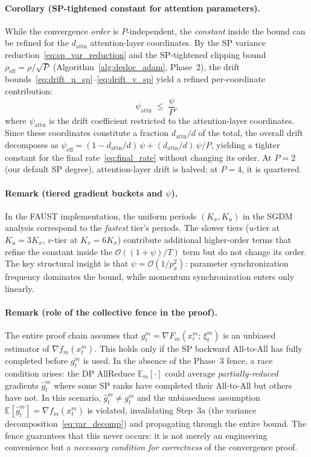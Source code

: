 \documentclass{article}
\begin{document}
\paragraph{Corollary (SP-tightened constant for attention parameters).}
While the convergence \emph{order} is $P$-independent, the
\emph{constant} inside the bound can be refined for the $d_{\text{attn}}$
attention-layer coordinates.
By the SP variance reduction~\eqref{eq:sp_var_reduction} and the
SP-tightened clipping bound $\rho_{\text{eff}} = \rho/\sqrt{P}$
(Algorithm~\ref{alg:desloc_adam}, Phase~2), the drift
bounds~\eqref{eq:drift_u_sp}--\eqref{eq:drift_v_sp} yield a
refined per-coordinate contribution:
\begin{equation}
\psi_{\text{attn}}
\;\leq\; \frac{\psi}{P},
\label{eq:psi_attn_sp}
\end{equation}
where $\psi_{\text{attn}}$ is the drift coefficient restricted to the
attention-layer coordinates. Since these coordinates constitute a fraction
$d_{\text{attn}}/d$ of the total, the overall drift decomposes as
$\psi_{\text{eff}} = (1 - d_{\text{attn}}/d)\,\psi + (d_{\text{attn}}/d)\,\psi/P$,
yielding a tighter constant for the final rate~\eqref{eq:final_rate}
without changing its order.
At $P = 2$ (our default SP degree), attention-layer drift is halved;
at $P = 4$, it is quartered.

\paragraph{Remark (tiered gradient buckets and $\psi$).}
In the FAUST implementation, the uniform periods $(K_x, K_u)$ in the
SGDM analysis correspond to the \emph{fastest} tier's periods. The slower
tiers ($u$-tier at $K_u = 3K_x$, $v$-tier at $K_v = 6K_x$) contribute
additional higher-order terms that refine the constant inside the
$\mathcal{O}((1+\psi)/T)$ term but do not change its order. The key
structural insight is that $\psi = \mathcal{O}(1/p_x^2)$: parameter
synchronization frequency dominates the bound, while momentum
synchronization enters only linearly.

\paragraph{Remark (role of the collective fence in the proof).}
The entire proof chain assumes that $g_t^m = \nabla F_m(x_t^m;\, \xi_t^m)$
is an unbiased estimator of $\nabla f_m(x_t^m)$. This holds only if the
SP backward All-to-All has fully completed before $g_t^m$ is used.
In the absence of the Phase~3 fence, a race condition arises:
the DP AllReduce $\mathbb{E}_m[\cdot]$ could average
\emph{partially-reduced} gradients $\hat{g}_t^m$ where some SP ranks have
completed their All-to-All but others have not.
In this scenario, $\hat{g}_t^m \neq g_t^m$ and the unbiasedness
assumption $\mathbb{E}[\hat{g}_t^m] = \nabla f_m(x_t^m)$ is violated,
invalidating Step~3a (the variance decomposition~\eqref{eq:var_decomp})
and propagating through the entire bound.
The fence guarantees that this never occurs: it is not merely an
engineering convenience but a \emph{necessary condition for correctness}
of the convergence proof.
\end{document}
